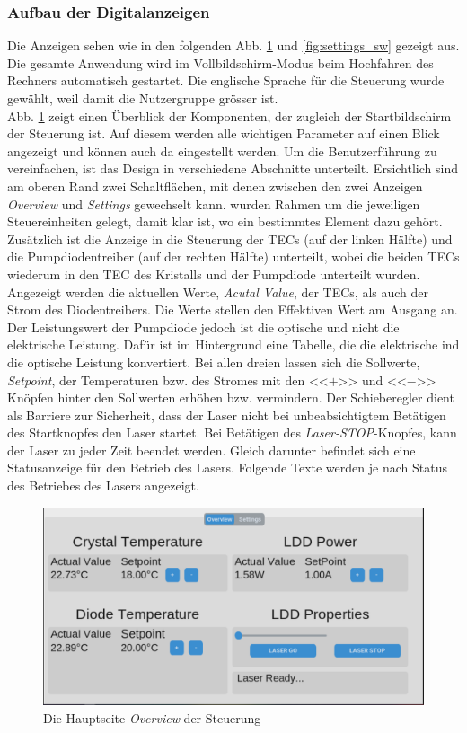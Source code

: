 \subsubsection{Aufbau der Digitalanzeigen}
Die Anzeigen sehen wie in den folgenden Abb. \ref{fig:overview_sw} und \ref{fig:settings_sw} gezeigt aus. Die gesamte Anwendung wird im Vollbildschirm-Modus beim Hochfahren des Rechners automatisch gestartet. Die englische Sprache für die Steuerung wurde gewählt, weil damit die Nutzergruppe grösser ist.\\
Abb. \ref{fig:overview_sw} zeigt einen Überblick der Komponenten, der zugleich der Startbildschirm der Steuerung ist. Auf diesem werden alle wichtigen Parameter auf einen Blick angezeigt und können auch da eingestellt werden. Um die Benutzerführung zu vereinfachen, ist das Design in verschiedene Abschnitte unterteilt. Ersichtlich sind am oberen Rand zwei Schaltflächen, mit denen zwischen den zwei Anzeigen \textit{Overview} und \textit{Settings} gewechselt kann.
wurden Rahmen um die jeweiligen Steuereinheiten gelegt, damit klar ist, wo ein bestimmtes Element dazu gehört. Zusätzlich ist die Anzeige in die Steuerung der TECs (auf der linken Hälfte) und die Pumpdiodentreiber (auf der rechten Hälfte) unterteilt, wobei die beiden TECs wiederum in den TEC des Kristalls und der Pumpdiode unterteilt wurden.\\
Angezeigt werden die aktuellen Werte, \textit{Acutal Value}, der TECs, als auch der Strom des Diodentreibers. Die Werte stellen den Effektiven Wert am Ausgang an. Der Leistungswert der Pumpdiode jedoch ist die optische und nicht die elektrische Leistung. Dafür ist im Hintergrund eine Tabelle, die die elektrische ind die optische Leistung konvertiert.
Bei allen dreien lassen sich die Sollwerte, \textit{Setpoint}, der Temperaturen bzw. des Stromes mit den <<$+$>> und <<$-$>> Knöpfen hinter den Sollwerten erhöhen bzw. vermindern.
Der Schieberegler dient als Barriere zur Sicherheit, dass der Laser nicht bei unbeabsichtigtem Betätigen des Startknopfes den Laser startet. Bei Betätigen des \textit{Laser-STOP}-Knopfes, kann der Laser zu jeder Zeit beendet werden. Gleich darunter befindet sich eine Statusanzeige für den Betrieb des Lasers. Folgende Texte werden je nach Status des Betriebes des Lasers angezeigt.


\begin{figure}[H]
    \centering
    \includegraphics[scale=0.3, trim={1mm 1mm 1mm 1mm}, clip]{98_images/window_overview_large_04.PNG}
    \caption{Die Hauptseite \textit{Overview} der Steuerung}
    \label{fig:overview_sw}
\end{figure}

